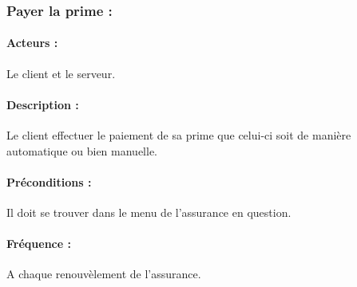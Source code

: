 \documentclass[../annexe.tex]{subfiles}
\begin{document}
\subsubsection{Payer la prime :}
		
\paragraph{Acteurs :}
		Le client et le serveur.
\paragraph{Description :}
		Le client effectuer le paiement de sa prime que celui-ci soit de manière automatique ou bien manuelle.
\paragraph{Préconditions :}
		Il doit se trouver dans le menu de l'assurance en question.
\paragraph{Fréquence :}
		A chaque renouvèlement de l'assurance.
\end{document}
